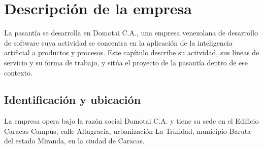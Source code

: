 %
%
%
%

\chapter{Descripción de la empresa}

La pasantía se desarrolla en Domotai C.A., una empresa venezolana de desarrollo
de software cuya actividad se concentra en la aplicación de la inteligencia
artificial a productos y procesos. Este capítulo describe su actividad, sus
líneas de servicio y su forma de trabajo, y sitúa el proyecto de la pasantía
dentro de ese contexto.

\section{Identificación y ubicación}

La empresa opera bajo la razón social Domotai C.A. y tiene su sede en el Edificio
Caracas Campus, calle Altagracia, urbanización La Trinidad, municipio Baruta del
estado Miranda, en la ciudad de Caracas.


